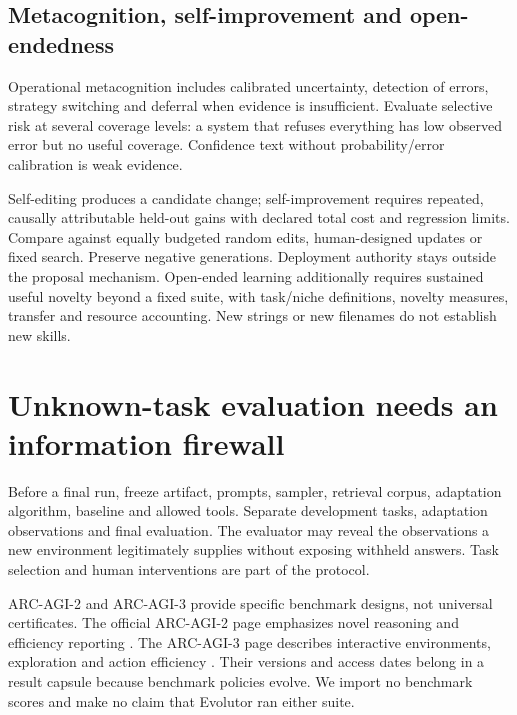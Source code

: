 \subsection{Metacognition, self-improvement and open-endedness}
Operational metacognition includes calibrated uncertainty, detection of errors,
strategy switching and deferral when evidence is insufficient. Evaluate selective
risk at several coverage levels: a system that refuses everything has low
observed error but no useful coverage. Confidence text without probability/error
calibration is weak evidence.

Self-editing produces a candidate change; self-improvement requires repeated,
causally attributable held-out gains with declared total cost and regression
limits. Compare against equally budgeted random edits, human-designed updates
or fixed search. Preserve negative generations. Deployment authority stays
outside the proposal mechanism. Open-ended learning additionally requires
sustained useful novelty beyond a fixed suite, with task/niche definitions,
novelty measures, transfer and resource accounting. New strings or new filenames
do not establish new skills.

\section{Unknown-task evaluation needs an information firewall}
Before a final run, freeze artifact, prompts, sampler, retrieval corpus,
adaptation algorithm, baseline and allowed tools. Separate development tasks,
adaptation observations and final evaluation. The evaluator may reveal the
observations a new environment legitimately supplies without exposing withheld
answers. Task selection and human interventions are part of the protocol.


ARC-AGI-2 and ARC-AGI-3 provide specific benchmark designs, not universal
certificates. The official ARC-AGI-2 page emphasizes novel reasoning and
efficiency reporting \cite{evod51:arc2}. The ARC-AGI-3 page describes
interactive environments, exploration and action efficiency
\cite{evod51:arc3}. Their versions and access dates belong in a result
capsule because benchmark policies evolve. We import no benchmark scores and
make no claim that Evolutor ran either suite.

